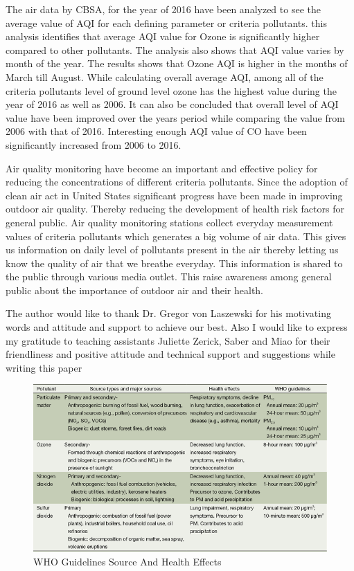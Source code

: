 \documentclass[sigconf]{acmart}
\begin{document}
   The  air data by CBSA, for the year of 2016  have been analyzed to see the average value of AQI for each defining parameter or criteria pollutants. this analysis identifies that average AQI value for Ozone is significantly higher compared to other pollutants. The analysis also shows that AQI value varies by month of the year. The results shows that Ozone AQI is higher in the months of March till August. While calculating overall average AQI, among all of the criteria pollutants level of ground level ozone has the highest value during the year of 2016 as well as 2006. It can also be concluded that overall level of AQI value have been improved over the years period while comparing the value from 2006 with that of 2016. Interesting enough AQI value of CO have been significantly increased from 2006 to 2016.
   
   Air quality monitoring have become an important and effective policy for reducing the concentrations of different criteria pollutants. Since the adoption of clean air act 
   in United States significant progress have been made in improving outdoor air quality.
   Thereby reducing the development of health risk factors for general public. Air quality monitoring stations collect everyday measurement values of criteria pollutants which generates a big volume of air data. This gives us information on daily level of pollutants present in the air thereby letting us know the quality of air that we breathe everyday. This information is shared to the public through various media outlet. This raise awareness among general public
   about the importance of outdoor air and their health.
   
  
  
\begin{acks}

  The author would like to thank Dr. Gregor von Laszewski for his motivating words and attitude and support to achieve our best. Also I would like to express my gratitude to teaching assistants Juliette Zerick, Saber and Miao for their friendliness and positive attitude and technical support and suggestions while writing this paper
  

\end{acks}

\begin{figure}[htb]
\includegraphics[width=1.0\columnwidth]{images/sourceandhealtheffects.png}
  \caption{WHO Guidelines Source And Health Effects \cite{guidelines}}
  \label{WHOGuidelines}
\end{figure}
\end{document}
